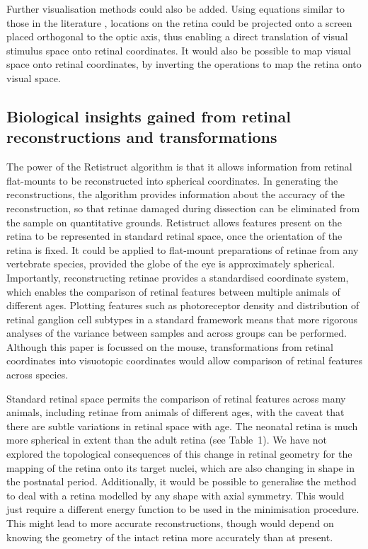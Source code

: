\documentclass[10pt]{article}
\begin{document}
Further visualisation methods could also be added. Using equations
similar to those in the literature \cite{BishopEtal1962}, locations on
the retina could be projected onto a screen placed orthogonal to the
optic axis, thus enabling a direct translation of visual stimulus
space onto retinal coordinates. It would also be possible to map
visual space onto retinal coordinates, by inverting the operations to
map the retina onto visual space. 

\subsection*{Biological insights gained from retinal
reconstructions and transformations}
The power of the Retistruct algorithm is that it allows information
from retinal flat-mounts to be reconstructed into spherical
coordinates. In generating the reconstructions, the algorithm
provides information about the accuracy of the reconstruction, so
that retinae damaged during dissection can be eliminated from the
sample on quantitative grounds. Retistruct allows features present on
the retina to be represented in standard retinal space, once the
orientation of the retina is fixed. It could be applied to flat-mount
preparations of retinae from any vertebrate species, provided the
globe of the eye is approximately spherical. Importantly,
reconstructing retinae provides a standardised coordinate system,
which enables the comparison of retinal features between multiple
animals of different ages. Plotting features such as photoreceptor
density and distribution of retinal ganglion cell subtypes in a
standard framework means that more rigorous analyses of the variance
between samples and across groups can be performed. Although this
paper is focussed on the mouse, transformations from retinal
coordinates into visuotopic coordinates would allow comparison of
retinal features across species. 

Standard retinal space permits the comparison of retinal features
across many animals, including retinae from animals of different
ages, with the caveat that there are subtle variations in retinal
space with age. The neonatal retina is much more spherical in extent
than the adult retina (see Table~1). We have not explored the
topological consequences of this change in retinal geometry for the
mapping of the retina onto its target nuclei, which are also changing
in shape in the postnatal period. Additionally, it would be possible
to generalise the method to deal with a retina modelled by any shape
with axial symmetry. This would just require a different energy
function to be used in the minimisation procedure. This might lead to
more accurate reconstructions, though would depend on knowing the
geometry of the intact retina more accurately than at present.
\end{document}
